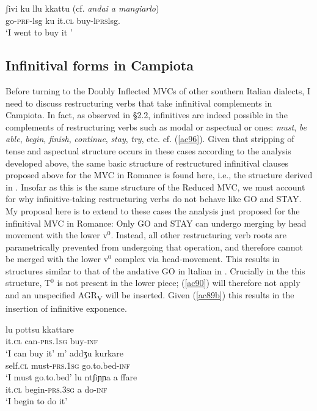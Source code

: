 \documentclass[output=paper]{langscibook}
\begin{document}
\ea \label{ac95} \gll  ʃivi  ku  llu kkattu (cf. \textit{andai a mangiarlo})\\
  go-\textsc{prf}-lsg  ku  it.\textsc{cl} buy-l\textsc{prs}lsg. \\
 \glt ‘I went to buy it '
\z

\subsection{Infinitival forms in Campiota}

Before turning to the Doubly Inflected MVCs of other southern Italian dialects, I need to discuss restructuring verbs that take infinitival complements in Campiota. In fact, as observed in §2.2, infinitives are indeed possible in the complements of restructuring verbs such as modal or aspectual or ones: \textit{must},\textit{ be  able},  \textit{begin},  \textit{finish},  \textit{continue},  \textit{stay},  \textit{try}, etc. cf. (\ref{ac96}). Given that stripping of tense and aspectual structure occurs in these cases according to the analysis developed above, the same basic structure of restructured infinitival clauses proposed above for the MVC in Romance is found here, i.e., the structure derived in . Insofar as this is the same structure of the Reduced MVC, we must account for why infinitive-taking restructuring verbs do not behave like GO and STAY. My proposal here is to extend to these cases the analysis just proposed for the infinitival MVC in Romance: Only GO and STAY can undergo merging  by  head  movement  with  the  lower  v$^0$.  Instead, all other restructuring verb roots are parametrically prevented from undergoing that operation, and therefore cannot be merged with the lower v$^0$ complex via head-movement. This results in structures similar to that of the andative GO in ltalian in . Crucially in the this structure, T$^0$ is not present in the lower piece; (\ref{ac90}) will therefore not apply and an unspecified AGR\textsubscript{V} will be inserted.  Given (\ref{ac89b}) this results in the insertion of infinitive exponence.

\ea \label{ac96}
    \ea \gll lu      pottsu     kkattare\\
    it.\textsc{cl} can-\textsc{prs}.\textsc{1sg} buy-\textsc{inf}\\
    \glt `I can buy it'
    \ex \gll m’    addʒu      kurkare\\
    self.\textsc{cl}  must-\textsc{prs}.\textsc{1sg}   go.to.bed-\textsc{inf} \\
    \glt `I must go.to.bed'
    \ex \gll lu ntʃiɲɲa       a  ffare\\
    it.\textsc{cl} begin-\textsc{prs}.\textsc{3sg} a  do-\textsc{inf} \\
    \glt `I begin to do it'
    \z
\z
\end{document}
